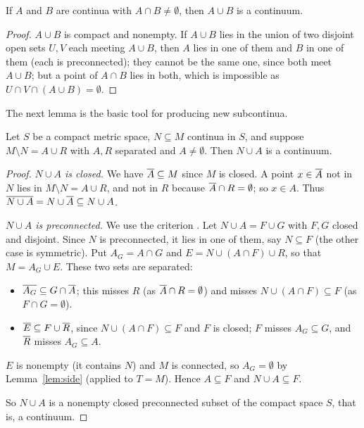 
\begin{lemma}\label{lem:union-continua}
If $A$ and $B$ are continua with $A\cap B\ne\emptyset$, then $A\cup B$ is a continuum.
\end{lemma}

\begin{proof}
$A\cup B$ is compact and nonempty. If $A\cup B$ lies in the union of two disjoint open sets
$U,V$ each meeting $A\cup B$, then $A$ lies in one of them and $B$ in one of them (each is
preconnected); they cannot be the same one, since both meet $A\cup B$; but a point of $A\cap B$
lies in both, which is impossible as $U\cap V\cap(A\cup B)=\emptyset$.
\end{proof}


The next lemma is the basic tool for producing new subcontinua.

\begin{lemma}\label{lem:piece}
Let $S$ be a compact metric space, $N\subseteq M$ continua in $S$, and suppose
$M\setminus N=A\cup R$ with $A,R$ separated and $A\neq\emptyset$. Then $N\cup A$ is a continuum.
\end{lemma}

\begin{proof}
\emph{$N\cup A$ is closed.} We have $\overline{A}\subseteq M$ since $M$ is closed. A point $x\in\overline{A}$ not in
$N$ lies in $M\setminus N=A\cup R$, and not in $R$ because $\overline{A}\cap R=\emptyset$; so $x\in A$. Thus
$\overline{N\cup A}=N\cup\overline{A}\subseteq N\cup A$.

\emph{$N\cup A$ is preconnected.} We use the criterion . Let $N\cup A=F\cup G$ with $F,G$
closed and disjoint. Since $N$ is preconnected, it lies in one of them, say $N\subseteq F$ (the other
case is symmetric). Put $A_G=A\cap G$ and $E=N\cup(A\cap F)\cup R$, so that $M=A_G\cup E$. These two
sets are separated:
\begin{itemize}
\item $\overline{A_G}\subseteq G\cap\overline{A}$; this misses $R$ (as $\overline{A}\cap R=\emptyset$) and misses
$N\cup(A\cap F)\subseteq F$ (as $F\cap G=\emptyset$).
\item $\overline{E}\subseteq F\cup\overline{R}$, since $N\cup(A\cap F)\subseteq F$ and $F$ is closed; $F$ misses
$A_G\subseteq G$, and $\overline{R}$ misses $A_G\subseteq A$.
\end{itemize}
$E$ is nonempty (it contains $N$) and $M$ is connected, so $A_G=\emptyset$ by Lemma~\ref{lem:side}
(applied to $T=M$). Hence $A\subseteq F$ and $N\cup A\subseteq F$.

So $N\cup A$ is a nonempty closed preconnected subset of the compact space $S$, that is, a
continuum.
\end{proof}

